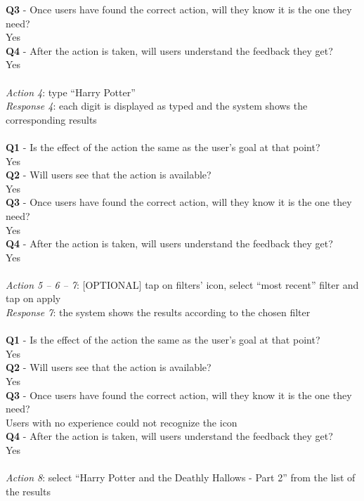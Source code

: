 \documentclass[12pt, a4paper]{article}
\numberwithin{figure}{section}
\newcommand\tab[1][1cm]{\hspace*{#1}}
\begin{document}
\textbf{Q3} - Once users have found the correct action, will they know it is the one they need?\\
\tab Yes\\
\textbf{Q4} - After the action is taken, will users understand the feedback they get?\\
\tab Yes\\\\
\textit{Action 4}: type “Harry Potter”\\
\textit{Response 4}: each digit is displayed as typed and the system shows the corresponding results\\\\
\textbf{Q1} - Is the effect of the action the same as the user’s goal at that point?\\
\tab Yes\\
\textbf{Q2} - Will users see that the action is available?\\
\tab Yes\\
\textbf{Q3} - Once users have found the correct action, will they know it is the one they need?\\
\tab Yes\\
\textbf{Q4} - After the action is taken, will users understand the feedback they get?\\
\tab Yes\\\\
\textit{Action 5 – 6 – 7}: [OPTIONAL] tap on filters’ icon, select “most recent” filter and tap on apply\\
\textit{Response 7}: the system shows the results according to the chosen filter\\\\
\textbf{Q1} - Is the effect of the action the same as the user’s goal at that point?\\
\tab Yes\\
\textbf{Q2} - Will users see that the action is available?\\
\tab Yes\\
\textbf{Q3} - Once users have found the correct action, will they know it is the one they need?\\
\tab Users with no experience could not recognize the icon\\
\textbf{Q4} - After the action is taken, will users understand the feedback they get?\\
\tab Yes\\\\
\textit{Action 8}: select “Harry Potter and the Deathly Hallows - Part 2” from the list of the results\\
\end{document}
